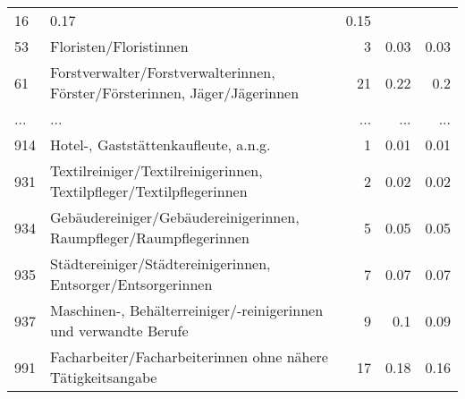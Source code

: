 \begin{longtable}{lXrrr}
          \num{16} &
          \num[round-mode=places,round-precision=2]{0.17} &
          \num[round-mode=places,round-precision=2]{0.15} \\
        53 & \multicolumn{1}{X}{Floristen/Floristinnen} & %
          \num{3} &
          \num[round-mode=places,round-precision=2]{0.03} &
          \num[round-mode=places,round-precision=2]{0.03} \\
        61 & \multicolumn{1}{X}{Forstverwalter/Forstverwalterinnen, Förster/Försterinnen, Jäger/Jägerinnen} & %
          \num{21} &
          \num[round-mode=places,round-precision=2]{0.22} &
          \num[round-mode=places,round-precision=2]{0.2} \\
       ... & ... & ... & ... & ... \\
        914 & \multicolumn{1}{X}{Hotel-, Gaststättenkaufleute, a.n.g.} & %
          \num{1} &
          \num[round-mode=places,round-precision=2]{0.01} &
          \num[round-mode=places,round-precision=2]{0.01} \\

        931 & \multicolumn{1}{X}{Textilreiniger/Textilreinigerinnen, Textilpfleger/Textilpflegerinnen} & %
          \num{2} &
          \num[round-mode=places,round-precision=2]{0.02} &
          \num[round-mode=places,round-precision=2]{0.02} \\

        934 & \multicolumn{1}{X}{Gebäudereiniger/Gebäudereinigerinnen, Raumpfleger/Raumpflegerinnen} & %
          \num{5} &
          \num[round-mode=places,round-precision=2]{0.05} &
          \num[round-mode=places,round-precision=2]{0.05} \\

        935 & \multicolumn{1}{X}{Städtereiniger/Städtereinigerinnen, Entsorger/Entsorgerinnen} & %
          \num{7} &
          \num[round-mode=places,round-precision=2]{0.07} &
          \num[round-mode=places,round-precision=2]{0.07} \\

        937 & \multicolumn{1}{X}{Maschinen-, Behälterreiniger/-reinigerinnen und verwandte Berufe} & %
          \num{9} &
          \num[round-mode=places,round-precision=2]{0.1} &
          \num[round-mode=places,round-precision=2]{0.09} \\

        991 & \multicolumn{1}{X}{Facharbeiter/Facharbeiterinnen ohne nähere Tätigkeitsangabe} & %
          \num{17} &
          \num[round-mode=places,round-precision=2]{0.18} &
          \num[round-mode=places,round-precision=2]{0.16} \\


\end{longtable}

